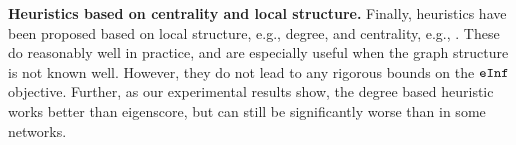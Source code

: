 \noindent
\textbf{Heuristics based on centrality and local structure.}
Finally, heuristics have been proposed based on local structure, e.g., degree, and centrality, e.g.,
\cite{PhysRevLett.91.247901,Miller2007EffectiveVS,Barabasi509}.
These do reasonably well in practice, and are especially useful when the graph structure is not known well.
However, they do not lead to any rigorous bounds on the $\texttt{eInf}$ objective.
Further, as our experimental results show, the degree based heuristic works better than eigenscore,
but can still be significantly worse than \algo{} in some networks.



